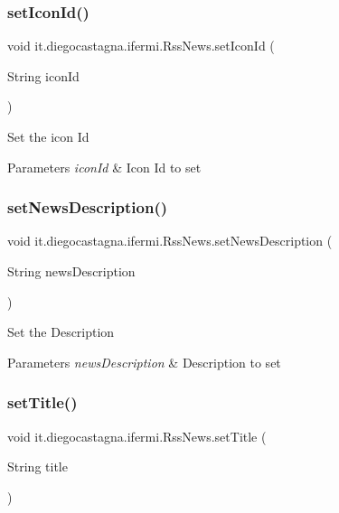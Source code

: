\subsubsection{\texorpdfstring{setIconId()}{setIconId()}}
{\footnotesize\ttfamily void it.\+diegocastagna.\+ifermi.\+Rss\+News.\+set\+Icon\+Id (\begin{DoxyParamCaption}\item[{String}]{icon\+Id }\end{DoxyParamCaption})\hspace{0.3cm}{\ttfamily [inline]}}

Set the icon Id 
\begin{DoxyParams}{Parameters}
{\em icon\+Id} & Icon Id to set \\
\hline
\end{DoxyParams}
\mbox{\label{classit_1_1diegocastagna_1_1ifermi_1_1_rss_news_addac79da6e66eb2aeffaa43d7b16b088}} 
\subsubsection{\texorpdfstring{setNewsDescription()}{setNewsDescription()}}
{\footnotesize\ttfamily void it.\+diegocastagna.\+ifermi.\+Rss\+News.\+set\+News\+Description (\begin{DoxyParamCaption}\item[{String}]{news\+Description }\end{DoxyParamCaption})\hspace{0.3cm}{\ttfamily [inline]}}

Set the Description 
\begin{DoxyParams}{Parameters}
{\em news\+Description} & Description to set \\
\hline
\end{DoxyParams}
\mbox{\label{classit_1_1diegocastagna_1_1ifermi_1_1_rss_news_ad323fc7a490f74343ce2cae7aaeebb35}} 
\subsubsection{\texorpdfstring{setTitle()}{setTitle()}}
{\footnotesize\ttfamily void it.\+diegocastagna.\+ifermi.\+Rss\+News.\+set\+Title (\begin{DoxyParamCaption}\item[{String}]{title }\end{DoxyParamCaption})\hspace{0.3cm}{\ttfamily [inline]}}

